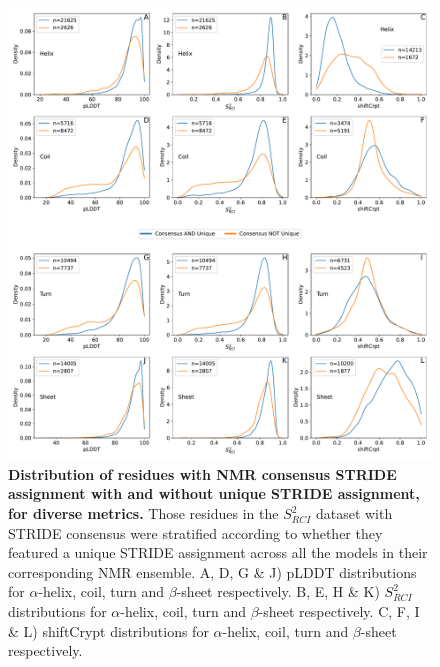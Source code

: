 \begin{figure}[H]
    \centering
    \includegraphics[width=\textwidth]{pLDDT/plddt_figures/with_and_without_unique_nmr_strideCons_stratified.pdf}
    \caption{\textbf{Distribution of residues with  NMR consensus STRIDE assignment with and without unique STRIDE assignment, for diverse metrics.} Those residues in the \(S^{2}_{RCI}\) dataset with STRIDE consensus were stratified according to whether they featured a unique STRIDE assignment across all the models in their corresponding NMR ensemble. A, D, G \& J) pLDDT distributions for $\alpha$-helix, coil, turn and $\beta$-sheet respectively. B, E, H \& K) \(S^{2}_{RCI}\) distributions for $\alpha$-helix, coil, turn and $\beta$-sheet respectively. C, F, I \& L) shiftCrypt distributions for $\alpha$-helix, coil, turn and $\beta$-sheet respectively.}

    \label{fig:unique_and_or_cons}
\end{figure}

